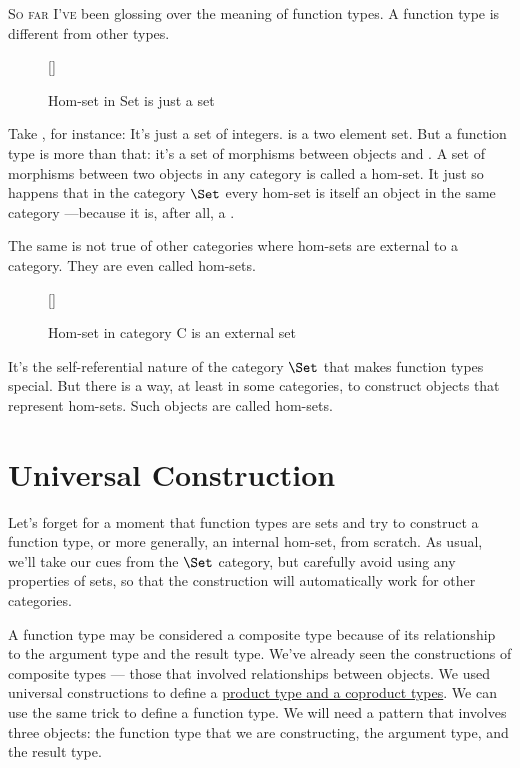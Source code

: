 \lettrine[lhang=0.17]{S}{o far I've} been glossing over the meaning of function types. A function
type is different from other types.

\begin{wrapfigure}[12]{R}{0pt}
\raisebox{0pt}[\dimexpr{}\baselineskip\relax]{
}%
\caption{Hom-set in Set is just a set}
\end{wrapfigure}

Take , for instance: It's just a set of integers.
 is a two element set. But a function type
 is more than that: it's a set of morphisms
between objects  and . A set of morphisms between
two objects in any category is called a hom-set. It just so happens that
in the category $\Set$ every hom-set is itself an object in the
same category ---because it is, after all, a .

The same is not true of other categories where hom-sets are external to
a category. They are even called  hom-sets.

\pagebreak
\begin{wrapfigure}[11]{R}{0pt}
\raisebox{0pt}[\dimexpr\height]{
}%
\caption{Hom-set in category C is an external set}
\end{wrapfigure}

\noindent
It's the self-referential nature of the category $\Set$ that makes
function types special. But there is a way, at least in some categories,
to construct objects that represent hom-sets. Such objects are called
 hom-sets.

\section{Universal Construction}\label{universal-construction}

Let's forget for a moment that function types are sets and try to
construct a function type, or more generally, an internal hom-set, from
scratch. As usual, we'll take our cues from the $\Set$ category,
but carefully avoid using any properties of sets, so that the
construction will automatically work for other categories.

A function type may be considered a composite type because of its
relationship to the argument type and the result type. We've already
seen the constructions of composite types --- those that involved
relationships between objects. We used universal constructions to define
a \hyperref[products-and-coproducts]{product
type and a coproduct types}. We can use the same trick to define a
function type. We will need a pattern that involves three objects: the
function type that we are constructing, the argument type, and the
result type.

